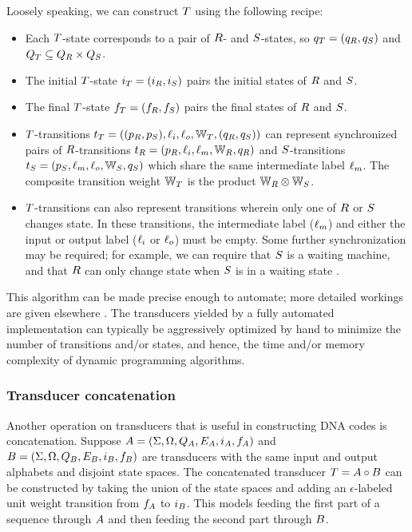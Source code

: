 \documentclass[english]{article}
\begin{document}
Loosely speaking, we can construct $T$ using the following recipe:
\begin{itemize}
\item Each $T$-state corresponds to a pair of $R$- and $S$-states,
so $q_{T} = (q_{R}, q_{S})$
and $Q_{T} \subseteq Q_{R} \times Q_{S}$.
\item The initial $T$-state $i_{T}=(i_{R},i_{S})$ pairs the initial states of $R$ and $S$.
\item The final $T$-state $f_{T}=(f_{R},f_{S})$ pairs the final states of $R$ and $S$.
\item $T$-transitions
$t_{T} = ((p_{R},p_{S}),\ell_i,\ell_o,\mathbb{W}_{T},(q_{R},q_{S}))$
can represent synchronized pairs of $R$-transitions
$t_{R} = (p_{R},\ell_i,\ell_m,\mathbb{W}_{R},q_{R})$
and $S$-transitions
$t_{S} = (p_{S},\ell_m,\ell_o,\mathbb{W}_{S},q_{S})$
which share the same intermediate label $\ell_m$.
The composite transition weight $\mathbb{W}_{T}$ is the product $\mathbb{W}_{R} \otimes \mathbb{W}_{S}$.
\item $T$-transitions can also represent transitions wherein only one of $R$ or $S$ changes state.
In these transitions, the intermediate label ($\ell_m$) and either the input or output label ($\ell_i$ or $\ell_o$)
must be empty.
Some further synchronization may be required; for example, we can require that $S$ is a waiting machine,
and that $R$ can only change state when $S$ is in a waiting state \cite{WestessonEtAlArxiv2012}.
\end{itemize}

This algorithm can be made precise enough to automate;
more detailed workings are given elsewhere \cite{PereiraRiley1996,MohriPereiraRiley2000,Holmes2003,Holmes2007,WestessonEtAlArxiv2012,WestessonEtAl2012}.
The transducers yielded by a fully automated implementation can typically be aggressively optimized by hand
to minimize the number of transitions and/or states,
and hence,
the time and/or memory complexity of dynamic programming algorithms.

\subsubsection{Transducer concatenation}

Another operation on transducers that is useful in constructing DNA codes
is concatenation.
Suppose
 $A = (\Sigma, \Omega, Q_{A}, E_{A}, i_{A}, f_{A})$ and
 $B = (\Sigma, \Omega, Q_{B}, E_{B}, i_{B}, f_{B})$
are transducers with the same input and output alphabets and disjoint state spaces.
The concatenated transducer $T = A \circ B$ can be constructed by
taking the union of the state spaces and adding an $\epsilon$-labeled unit weight transition
from $f_{A}$ to $i_{B}$.
This models feeding the first part of a sequence through $A$ and then feeding the second part through $B$.
\end{document}
